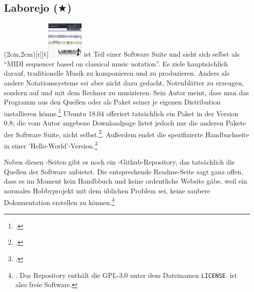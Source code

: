 %
%
%



\subsection{Laborejo ($\bigstar$)}

\parpic(2cm,2cm)[r][t]{\includegraphics[width=1.8cm]{logos/laborejo-300dpi.png}}
\label{Laborejo} ist Teil einer Software Suite und sieht sich
selbst als \enquote{MIDI sequencer based on classical music notation}. Es ziele
hauptsächlich darauf, traditionelle Musik zu komponieren und zu produzieren.
Anders als andere Notationssysteme sei  aber nicht dazu gedacht,
Notenblätter zu erzeugen, sondern auf und mit dem Rechner zu musizieren. Sein
Autor meint, dass man das Programm aus den Quellen oder als Paket seiner je
eigenen Distribution installieren könne.\footcite[vgl.][\nopage
wp]{Hilbricht2019a} Ubuntu 18.04 offeriert tatsächlich ein Paket 
in der Version 0.8; die vom Autor angebene Downloadpage listet jedoch nur die
anderen Pakete der Software Suite, nicht 
selbst.\footcite[vgl.][\nopage wp]{Hilbricht2019b}. Außerdem endet die
spezifizierte Handbuchseite in einer
'Hello-World'-Version.\footcite[vgl.][\nopage wp]{Hilbricht2019c}

Neben diesen -Seiten gibt es noch ein
-Github-Repository, das tatsächlich die Quellen der Software
anbietet. Die entsprechende Readme-Seite sagt ganz offen, dass es im Moment kein
Handbbuch und keine ordentliche Website gäbe, weil  ein normales
Hobbyprojekt mit dem üblichen Problem sei, keine saubere Dokumentation erstellen
zu können.\footnote{\cite[vgl.][\nopage wp]{Laborejo2018a}. Das Repository
enthält die GPL-3.0 unter dem Dateinamen \texttt{LICENSE}.  ist
also freie Software.}

